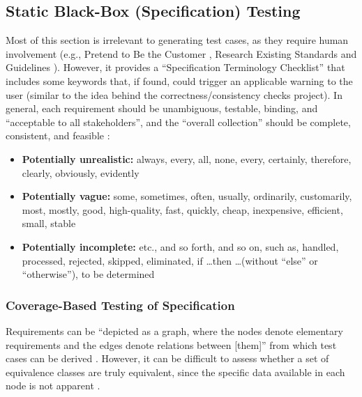 \subsection{Static Black-Box (Specification) Testing
      \citep[pp.~56-62]{Patton2006}}

Most of this section is irrelevant to generating test cases, as they require
human involvement  (e.g., Pretend to Be the Customer
\citep[pp.~57-58]{Patton2006}, Research Existing Standards and
Guidelines \citep[pp.~58-59]{Patton2006}). However, it provides a
``Specification Terminology Checklist'' \citep[p.~61]{Patton2006} that
includes some keywords that, if found, could trigger an applicable warning to
the user (similar to the idea behind the correctness/consistency checks
project). In general, each requirement should be unambiguous, testable,
binding, and ``acceptable to all stakeholders'', and the ``overall collection''
should be complete, consistent, and feasible \citep[p.~1-8]{SWEBOK2024}:

\begin{itemize}
      \item \textbf{Potentially unrealistic:} always, every, all, none, every,
            certainly, therefore, clearly, obviously, evidently
      \item \textbf{Potentially vague:} some, sometimes, often, usually,
            ordinarily, customarily, most, mostly, good, high-quality, fast,
            quickly, cheap, inexpensive, efficient, small, stable
      \item \textbf{Potentially incomplete:} etc., and so forth, and so on,
            such as, handled, processed, rejected, skipped, eliminated,
            if \dots then \dots (without ``else'' or ``otherwise''),
            to be determined \citep[p.~408]{vanVliet2000}
\end{itemize}

\subsubsection{Coverage-Based Testing of Specification
      \citep[pp.~425-426]{vanVliet2000}}

Requirements can be ``depicted as a graph, where the nodes denote elementary
requirements and the edges denote relations between [them]'' from which test
cases can be derived \citep[p.~425]{vanVliet2000}. However, it can
be difficult to assess whether a set of equivalence classes are truly
equivalent, since the specific data available in each node is not apparent
\citep[p.~426]{vanVliet2000}.

